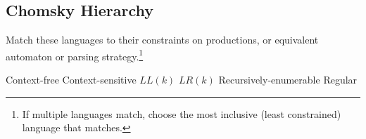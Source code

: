 \documentclass[addpoints]{exam}
\begin{document}
\begin{questions}
\section{Chomsky Hierarchy}
\question Match these languages to their constraints on productions, or equivalent automaton or parsing strategy.\footnote{If multiple languages match, choose the most inclusive (least constrained) language that matches.}\\
\begin{oneparchoices}
\choice Context-free
\choice Context-sensitive
\choice $LL(k)$
\choice $LR(k)$
\choice Recursively-enumerable
\choice Regular
\end{oneparchoices}

\end{questions}
\end{document}

